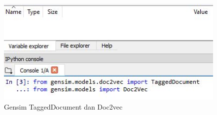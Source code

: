 \begin{enumerate}
\begin{figure}[!htbp]
\centerline{\includegraphics[width=1\textwidth]{figures/c5p/22.JPG}}
\caption{Gensim TaggedDocument dan Doc2vec}
\label{c5_22}
\end{figure}


\end{enumerate}
